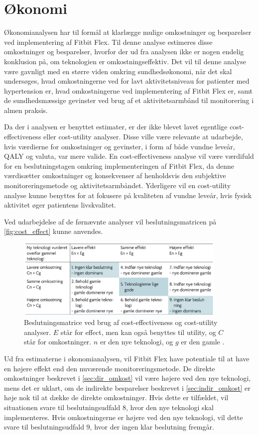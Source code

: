 \section{Økonomi} \label{sec:dis_oekonomi}
Økonomianalysen har til formål at klarlægge mulige omkostninger og besparelser ved implementering af Fitbit Flex. Til denne analyse estimeres disse omkostninger og besparelser, hvorfor der ud fra analysen ikke er nogen endelig konklusion på, om teknologien er omkostningseffektiv. Det vil til denne analyse være gavnligt med en større viden omkring sundhedsøkonomi, når det skal undersøges, hvad omkostningerne ved for lavt aktivitetsniveau for patienter med hypertension er, hvad omkostningerne ved implementering af Fitbit Flex er, samt de sundhedsmæssige gevinster ved brug af et aktivitetsarmbånd til monitorering i almen praksis. 

Da der i analysen er benyttet estimater, er der ikke blevet lavet egentlige cost-effectiveness eller cost-utility analyser. Disse ville være relevante at udarbejde, hvis værdierne for omkostninger og gevinster, i form af både vundne leveår, QALY og valuta, var mere valide. En cost-effectiveness analyse vil være værdifuld for en beslutningstagen omkring implementeringen af Fitbit Flex, da denne værdisætter omkostninger og konsekvenser af henholdsvis den subjektive monitoreringsmetode og aktivitetsarmbåndet. Yderligere vil en cost-utility analyse kunne benyttes for at fokusere på kvaliteten af vundne leveår, hvis fysisk aktivitet øger patientens livskvalitet.

Ved udarbejdelse af de førnævnte analyser vil beslutningsmatricen på \autoref{fig:cost_effect} kunne anvendes. 

\begin{figure}[H]
	\centering
	\includegraphics[width=0.9\textwidth]{figures/cost-effectiveness}
	\caption{Beslutningsmatrice ved brug af cost-effectiveness og cost-utility analyser. $E$ står for effect, men kan også benyttes til utility, og $C$ står for omkostninger. $n$ er den nye teknologi, og $g$ er den gamle \citep{mtvhaandbog}.}
	\label{fig:cost_effect}
\end{figure}

\noindent
Ud fra estimaterne i økonomianalysen, vil Fitbit Flex have potentiale til at have en højere effekt end den nuværende monitoreringsmetode. De direkte omkostninger beskrevet i \autoref{sec:dir_omkost} vil være højere ved den nye teknologi, mens det er uklart, om de indirekte besparelser beskrevet i \autoref{sec:indir_omkost} er høje nok til at dække de direkte omkostninger. Hvis dette er tilfældet, vil situationen svare til beslutningsudfald 8, hvor den nye teknologi skal implementeres. Hvis omkostningerne er højere ved den nye teknologi, vil dette svare til beslutningsudfald 9, hvor der ingen klar beslutning fremgår. 